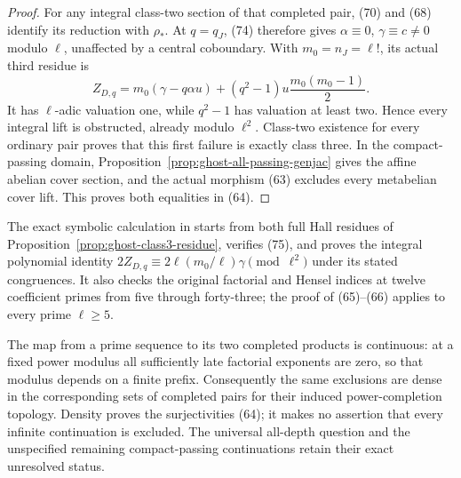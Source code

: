 \begin{proof}
For any integral class-two section of that completed
pair, (70) and (68) identify its reduction with
\(\rho_*\). At \(q=q_J\), (74) therefore gives
\(\alpha\equiv0\), \(\gamma\equiv c\ne0\)
modulo \(\ell\), unaffected by a central
coboundary. With \(m_0=n_J=\ell!\), its actual
third residue is
\[
 Z_{D,q}=m_0(\gamma-q\alpha u)
             +(q^2-1)u\frac{m_0(m_0-1)}2.
                                                        \tag{75}
\]
It has \(\ell\)-adic valuation one, while
\(q^2-1\) has valuation at least two. Hence every
integral lift is obstructed, already modulo
\(\ell^2\). Class-two existence for every
ordinary pair proves that this first failure is
exactly class three. In the compact-passing
domain, Proposition~\ref{prop:ghost-all-passing-genjac}
gives the affine abelian cover section, and the
actual morphism (63) excludes every metabelian
cover lift. This proves both equalities in (64).
\end{proof}

The exact symbolic calculation in
 starts from both
full Hall residues of
Proposition~\ref{prop:ghost-class3-residue}, verifies
(75), and proves the integral polynomial identity
\(2Z_{D,q}\equiv2\ell(m_0/\ell)\gamma\pmod{\ell^2}\)
under its stated congruences. It also checks the
original factorial and Hensel indices at twelve
coefficient primes from five through forty-three;
the proof of (65)--(66) applies to every prime
\(\ell\ge5\).

The map from a prime sequence to its two completed
products is continuous: at a fixed power modulus
all sufficiently late factorial exponents are
zero, so that modulus depends on a finite prefix.
Consequently the same exclusions are dense in the
corresponding sets of completed pairs for their
induced power-completion topology. Density proves
the surjectivities (64); it makes no assertion that
every infinite continuation is excluded. The
universal all-depth question and the unspecified
remaining compact-passing continuations retain
their exact unresolved status.
